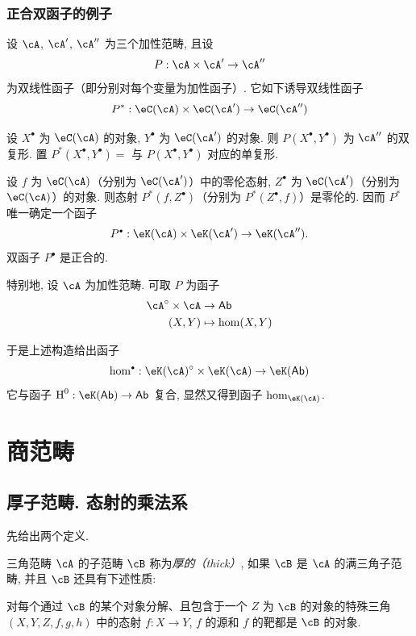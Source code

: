 \subsubsection{正合双函子的例子}\label{VIII:1-3-3}

设 $\cA$, $\cA'$, $\cA''$ 为三个加性范畴, 且设
\[
  P:\cA\times \cA'\to \cA''
\]
为双线性函子（即分别对每个变量为加性函子）. 它如下诱导双线性函子
\[
  P^\ast:\eC(\cA)\times \eC(\cA') \to \eC(\cA'')
\]

设 $X^\bullet$ 为 $\eC(\cA)$ 的对象, $Y^\bullet$ 为 $\eC(\cA')$ 的对象. 则 $P(X^\bullet,Y^\bullet)$ 为 $\cA''$ 的双复形. 置 $P^\ast(X^\bullet,Y^\bullet) = $ 与 $P(X^\bullet,Y^\bullet)$ 对应的单复形.

设 $f$ 为 $\eC(\cA)$（分别为 $\eC(\cA')$）中的零伦态射, $Z^\bullet$ 为 $\eC(\cA')$（分别为 $\eC(\cA)$）的对象. 则态射 $P^\ast(f,Z^\bullet)$（分别为 $P^\ast(Z^\bullet,f)$）是零伦的. 因而 $P^\ast$ 唯一确定一个函子
\[
  P^\bullet:\eK(\cA) \times \eK(\cA') \to \eK(\cA'') \text{.}
\]
双函子 $P^\bullet$ 是正合的.

特别地, 设 $\cA$ 为加性范畴. 可取 $P$ 为函子
\begin{align*}
  \cA^\circ\times \cA &\to \mathsf{Ab} \\
  (X,Y) &\mapsto \hom(X,Y)
\end{align*}

于是上述构造给出函子
\[
  \hom^\bullet:\eK(\cA)^\circ \times \eK(\cA) \to \eK(\mathsf{Ab})
\]
它与函子 $\h^0:\eK(\mathsf{Ab})\to \mathsf{Ab}$ 复合, 显然又得到函子 $\hom_{\eK(\cA)}$.

\section{商范畴}\label{VIII:2}

\subsection{厚子范畴. 态射的乘法系}\label{VIII:2-1}

先给出两个定义.

\begin{definition}\label{VIII:2-1-1}
三角范畴 $\cA$ 的子范畴 $\cB$ 称为\emph{厚的（thick）}, 如果 $\cB$ 是 $\cA$ 的满三角子范畴, 并且 $\cB$ 还具有下述性质:

对每个通过 $\cB$ 的某个对象分解、且包含于一个 $Z$ 为 $\cB$ 的对象的特殊三角 $(X,Y,Z,f,g,h)$ 中的态射 $f:X\to Y$, $f$ 的源和 $f$ 的靶都是 $\cB$ 的对象.
\end{definition}

